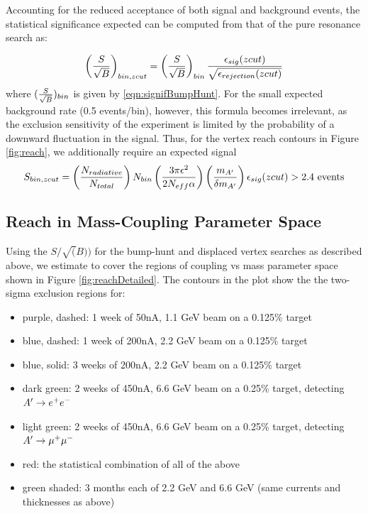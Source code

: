 Accounting for the reduced acceptance of both signal and background events, the statistical 
significance expected  can be computed from that of the pure resonance 
search as:  

\begin{equation}
 \left({{S} \over {\sqrt{B}}}\right)_{bin,zcut}=\left ({{S} \over {\sqrt{B}}}\right)_{bin}  
{{\epsilon_{sig} (zcut)} \over {\sqrt{\epsilon_{rejection} (zcut)}}}
\label{eqn:signifVertex}
\end{equation}
where $({{S} \over {\sqrt{B}}})_{bin}$ is given by \eqref{eqn:signifBumpHunt}. For the small expected background rate 
(0.5 events/bin), however, this formula becomes irrelevant, as the exclusion sensitivity of 
the experiment is limited by the probability of a downward fluctuation in the signal.  
Thus, for the vertex reach contours in Figure \ref{fig:reach}, we additionally require 
an expected signal
\begin{equation}
 S_{bin,zcut}=\left({{N_{radiative} \over {N_{total}}}}\right) N_{bin} 
\left({{3\pi \epsilon^2} \over {2 N_{eff}\alpha}}\right) \left({{m_{A'}} \over {\delta m_{A'}}}\right) \epsilon_{sig}
 (zcut) > 2.4~ {\rm events} 
 \label{eqn:signalVertex}
\end{equation}

\subsection{Reach in Mass-Coupling Parameter Space}

Using the $S/\sqrt(B))$ for the bump-hunt  and displaced vertex searches as described above, we estimate to cover the regions of coupling vs mass parameter space shown in Figure \ref{fig:reachDetailed}.  The contours in the plot show the the two-sigma exclusion regions for:
\begin{itemize}
\item purple, dashed: 1 week of 50nA, 1.1 GeV beam on a 0.125\% target
\item blue, dashed: 1 week of 200nA, 2.2 GeV beam on a 0.125\% target
\item blue, solid: 3 weeks of 200nA, 2.2 GeV beam on a 0.125\% target
\item dark green: 2 weeks of 450nA, 6.6 GeV beam on a 0.25\% target, detecting $A^\prime\rightarrow e^+e^-$
\item light green: 2 weeks of 450nA, 6.6 GeV beam on a 0.25\% target, detecting $A^\prime\rightarrow \mu^+\mu^-$
\item red:  the statistical combination of all of the above
\item green shaded:  3 months each of 2.2 GeV and 6.6 GeV (same currents and thicknesses as above)
\end{itemize}



